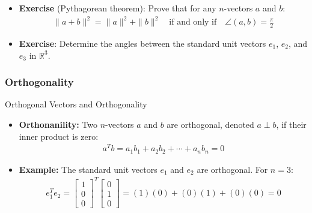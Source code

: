 \begin{frame}
    \begin{itemize}
        \item \textbf{Exercise} (Pythagorean theorem): Prove that for any $n$-vectors $a$ and $b$:
    \begin{align}
        \|a + b\|^2 = \|a\|^2 + \|b\|^2 \quad \text{if and only if} \quad \angle(a, b) = \frac{\pi}{2}
    \end{align}
    \item \textbf{Exercise}: Determine the angles between the standard unit vectors $e_1$, $e_2$, and $e_3$ in $\mathbb{R}^3$.
    \end{itemize}
\end{frame}


\subsubsection{Orthogonality}
\begin{frame}{Orthogonal Vectors and Orthogonality}
\begin{itemize}
\item \textbf{Orthonanility:} Two $n$-vectors $a$ and $b$ are orthogonal, denoted $a \perp b$, if their inner product is zero:
\begin{align}
    a^T b = a_1 b_1 + a_2 b_2 + \cdots + a_n b_n = 0
\end{align}
\item \textbf{Example:} The standard unit vectors $e_1$ and $e_2$ are orthogonal. For $n=3$:
\begin{align*}
    e_1^T e_2 = \begin{bmatrix} 1 \\ 0 \\ 0 \end{bmatrix}^T \begin{bmatrix} 0 \\ 1 \\ 0 \end{bmatrix} = (1)(0) + (0)(1) + (0)(0) = 0
\end{align*}
\end{itemize}
\end{frame}


